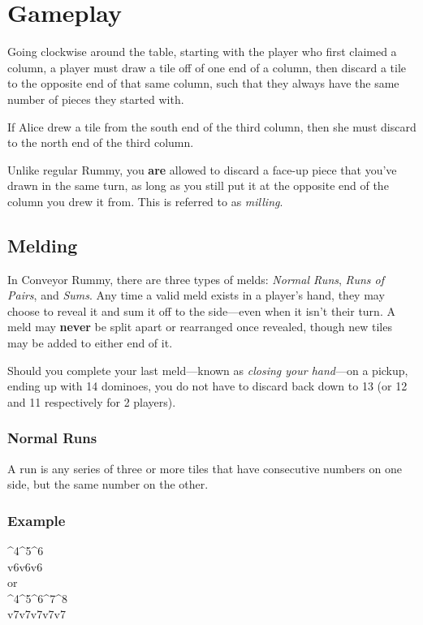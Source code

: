 \section{Gameplay}
Going clockwise around the table, starting with the player who first claimed a column, a player must draw a tile off of one end of a column, then discard a tile to the opposite end of that same column, such that they always have the same number of pieces they started with.

\example If Alice drew a tile from the south end of the third column, then she must discard to the north end of the third column.

\note Unlike regular Rummy, you \textbf{are} allowed to discard a face-up piece that you've drawn in the same turn, as long as you still put it at the opposite end of the column you drew it from. This is referred to as \textit{milling}.

\subsection{Melding}\label{sec:melding}
In Conveyor Rummy, there are three types of melds: \textit{Normal Runs}, \textit{Runs of Pairs}, and \textit{Sums}.
Any time a valid meld exists in a player's hand, they may choose to reveal it and sum it off to the side---even when it isn't their turn.
A meld may \textbf{never} be split apart or rearranged once revealed, though new tiles may be added to either end of it.

Should you complete your last meld---known as \textit{closing your hand}---on a pickup, ending up with 14 dominoes, you do not have to discard back down to 13 (or 12 and 11 respectively for 2 players).

\subsubsection{Normal Runs}
A run is any series of three or more tiles that have consecutive numbers on one side, but the same number on the other.

\subsubsection*{Example}
{\domino ^4^5^6\\v6v6v6}\vspace{1mm}\\
\vspace{1mm}or\\
{\domino ^4^5^6^7^8\\v7v7v7v7v7}

